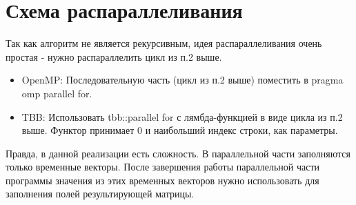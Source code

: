 \documentclass{report}
\begin{document}
\newpage
\section* {Схема распараллеливания}
Так как алгоритм не является рекурсивным, идея распараллеливания очень простая - нужно распараллелить цикл из п.2 выше.
\begin{itemize}
    \item OpenMP: Последовательную часть (цикл из п.2 выше) поместить в pragma omp parallel for.
    \item TBB: Использовать tbb::parallel for с лямбда-функцией в виде цикла из п.2 выше. Функтор принимает 0 и наибольший индекс строки, как параметры.
\end{itemize}
Правда, в данной реализации есть сложность. В параллельной части заполняются только временные векторы. После завершения работы параллельной части программы значения из этих временных векторов нужно использовать для заполнения полей результирующей матрицы.

\newpage
\end{document}

